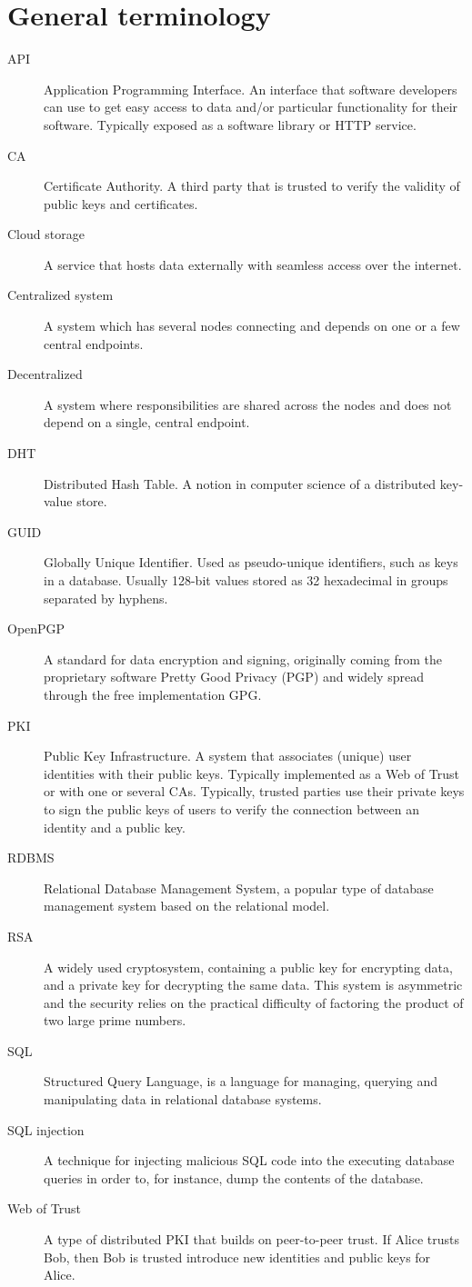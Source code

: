\section{General terminology}
\begin{description}
  \item[API] Application Programming Interface. An interface that software developers can use to get easy access to data and/or particular functionality for their software. Typically exposed as a software library or HTTP service.
  \item[CA] Certificate Authority. A third party that is trusted to verify the validity of public keys and certificates.
  \item[Cloud storage] A service that hosts data externally with seamless access over the internet.
  \item[Centralized system] A system which has several nodes connecting and depends on one or a few central endpoints.
  \item[Decentralized] A system where responsibilities are shared across the nodes and does not depend on a single, central endpoint.
  \item[DHT] Distributed Hash Table. A notion in computer science of a distributed key-value store.
  \item[GUID] Globally Unique Identifier. Used as pseudo-unique identifiers, such as keys in a database. Usually 128-bit values stored as 32 hexadecimal in groups separated by hyphens. 
  \item[OpenPGP] A standard for data encryption and signing, originally coming from the proprietary software Pretty Good Privacy (PGP) and widely spread through the free implementation GPG.
  \item[PKI] Public Key Infrastructure. A system that associates (unique) user identities with their public keys. Typically implemented as a Web of Trust or with one or several CAs. Typically, trusted parties use their private keys to sign the public keys of users to verify the connection between an identity and a public key.
  \item[RDBMS] Relational Database Management System, a popular type of database management system based on the relational model.
  \item[RSA] A widely used cryptosystem, containing a public key for encrypting data, and a private key for decrypting the same data. This system is asymmetric and the security relies on the practical difficulty of factoring the product of two large prime numbers.
  \item[SQL] Structured Query Language, is a language for managing, querying and manipulating data in relational database systems.
  \item[SQL injection] A technique for injecting malicious SQL code into the executing database queries in order to, for instance, dump the contents of the database.
  \item[Web of Trust] A type of distributed PKI that builds on peer-to-peer trust. If Alice trusts Bob, then Bob is trusted introduce new identities and public keys for Alice.
\end{description}

